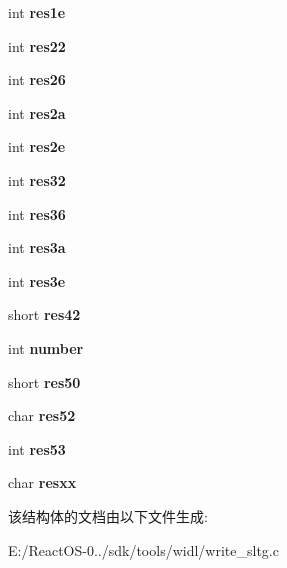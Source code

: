 \begin{DoxyCompactItemize}
int {\bfseries res1e}
\item 
\mbox{\label{structsltg__hrefinfo_a97307434738f2f8275f4ec3b22b048c7}} 
int {\bfseries res22}
\item 
\mbox{\label{structsltg__hrefinfo_aa9caa0c347e66460ba0ee31f2f575a66}} 
int {\bfseries res26}
\item 
\mbox{\label{structsltg__hrefinfo_ae571373c1d5c3572adf07e1ccec632d3}} 
int {\bfseries res2a}
\item 
\mbox{\label{structsltg__hrefinfo_a8175a1afb415ac1ecd151489c794ee6d}} 
int {\bfseries res2e}
\item 
\mbox{\label{structsltg__hrefinfo_a85411c8fa5b3ad6fd26a786643216de7}} 
int {\bfseries res32}
\item 
\mbox{\label{structsltg__hrefinfo_a9352cb12995ce1473492cddeeb520173}} 
int {\bfseries res36}
\item 
\mbox{\label{structsltg__hrefinfo_add59f95e02b9f45b6516cd8ba2b549b0}} 
int {\bfseries res3a}
\item 
\mbox{\label{structsltg__hrefinfo_a7a7bd99ca7e6059666c7d8d4557ae897}} 
int {\bfseries res3e}
\item 
\mbox{\label{structsltg__hrefinfo_a3259d169824ce4b368c2c24b1a91758a}} 
short {\bfseries res42}
\item 
\mbox{\label{structsltg__hrefinfo_a3c875c784598cbae29b3589e0a121b3b}} 
int {\bfseries number}
\item 
\mbox{\label{structsltg__hrefinfo_aa318c0a7ef95e44cb70a3d1cf0967b1c}} 
short {\bfseries res50}
\item 
\mbox{\label{structsltg__hrefinfo_abb3f404df6997f2fbdff4d4fb87a7342}} 
char {\bfseries res52}
\item 
\mbox{\label{structsltg__hrefinfo_aeaff24f8d309443d505ce35b07c97fc0}} 
int {\bfseries res53}
\item 
\mbox{\label{structsltg__hrefinfo_abd9f0b64e659144faa4e64d672606fcd}} 
char {\bfseries resxx}
\end{DoxyCompactItemize}


该结构体的文档由以下文件生成\+:\begin{DoxyCompactItemize}
\item 
E\+:/\+React\+O\+S-\/0../sdk/tools/widl/write\+\_\+sltg.\+c\end{DoxyCompactItemize}
